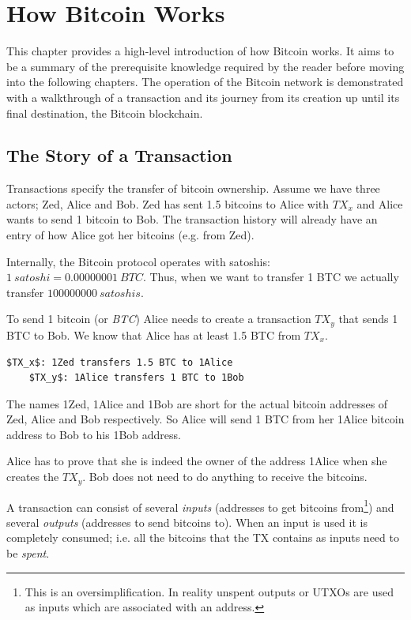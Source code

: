 \chapter{How Bitcoin Works}

\begin{summary}
This chapter provides a high-level introduction of how Bitcoin works. It aims to be a summary of the prerequisite knowledge required by the reader before moving into the following chapters. The operation of the Bitcoin network is demonstrated with a walkthrough of a transaction and its journey from its creation up until its final destination, the Bitcoin blockchain.
\end{summary}

\section{The Story of a Transaction}
Transactions specify the transfer of bitcoin ownership. Assume we have three actors; Zed, Alice and Bob. Zed has sent 1.5 bitcoins to Alice with $TX_x$ and Alice wants to send 1 bitcoin to Bob. The transaction history will already have an entry of how Alice got her bitcoins (e.g. from Zed).

\begin{note}
Internally, the Bitcoin protocol operates with satoshis: $1~satoshi = 0.00000001~BTC$. Thus, when we want to transfer 1 BTC we actually transfer $100000000~satoshis$.
\end{note}

To send 1 bitcoin (or \emph{BTC}) Alice needs to create a transaction $TX_y$ that sends 1 BTC to Bob. We know that Alice has at least 1.5 BTC from $TX_x$.

\begin{emphbox}
\begin{lstlisting}[style=Pseudomath]
    $TX_x$: 1Zed transfers 1.5 BTC to 1Alice
    $TX_y$: 1Alice transfers 1 BTC to 1Bob
\end{lstlisting}
\end{emphbox}

The names 1Zed, 1Alice and 1Bob are short for the actual bitcoin addresses of Zed, Alice and Bob respectively. So Alice will send 1 BTC from her 1Alice bitcoin address to Bob to his 1Bob address.

Alice has to prove that she is indeed the owner of the address 1Alice when she creates the $TX_y$. Bob does not need to do anything to receive the bitcoins.

A transaction can consist of several \emph{inputs} (addresses to get bitcoins from\footnote{This is an oversimplification. In reality unspent outputs or UTXOs are used as inputs which are associated with an address.}) and several \emph{outputs} (addresses to send bitcoins to). When an input is used it is completely consumed; i.e. all the bitcoins that the TX contains as inputs need to be \emph{spent}.

